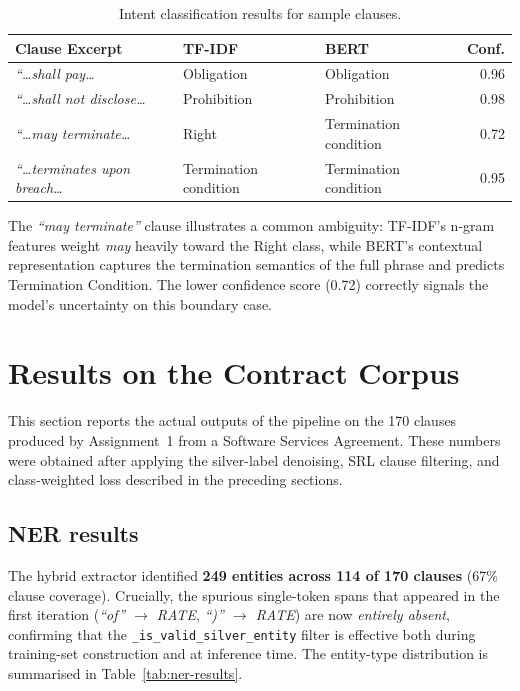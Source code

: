 \documentclass[assignment.tex]{subfiles}
\begin{document}
\begin{table}[H]
    \centering
    \caption{Intent classification results for sample clauses.}
    \label{tab:intent-example}
    {\small
    \begin{tabularx}{\textwidth}{@{}>{\raggedright\arraybackslash}p{3.8cm}>{\raggedright\arraybackslash}p{2.0cm}>{\raggedright\arraybackslash}Xr@{}}
        \toprule
        \textbf{Clause Excerpt} & \textbf{TF-IDF} & \textbf{BERT} & \textbf{Conf.} \\
        \midrule
        \textit{``\ldots shall pay\ldots} & Obligation & Obligation & 0.96 \\
        \textit{``\ldots shall not disclose\ldots} & Prohibition & Prohibition & 0.98 \\
        \textit{``\ldots may terminate\ldots} & Right & Termination condition & 0.72 \\
        \textit{``\ldots terminates upon breach\ldots} & Termination condition & Termination condition & 0.95 \\
        \bottomrule
    \end{tabularx}
    }
\end{table}

The \textit{``may terminate''} clause illustrates a common ambiguity: TF-IDF's
n-gram features weight \textit{may} heavily toward the Right class, while BERT's
contextual representation captures the termination semantics of the full phrase
and predicts Termination Condition.  The lower confidence score (0.72) correctly
signals the model's uncertainty on this boundary case.

\section{Results on the Contract Corpus}
\label{sec:a2-results}

This section reports the actual outputs of the pipeline on the 170 clauses
produced by Assignment~1 from a Software Services Agreement.  These numbers
were obtained after applying the silver-label denoising, SRL clause filtering,
and class-weighted loss described in the preceding sections.

\subsection{NER results}

The hybrid extractor identified \textbf{249 entities across 114 of 170
clauses} (67\% clause coverage).  Crucially, the spurious single-token spans
that appeared in the first iteration (\textit{``of'' $\rightarrow$ RATE},
\textit{``)'' $\rightarrow$ RATE}) are now \emph{entirely absent}, confirming
that the \texttt{\_is\_valid\_silver\_entity} filter is effective both during
training-set construction and at inference time.
The entity-type distribution is summarised in Table~\ref{tab:ner-results}.
\end{document}
